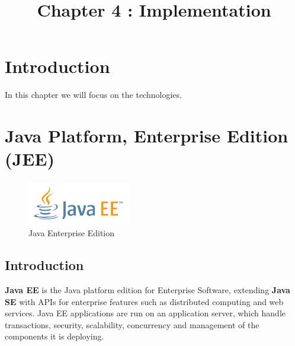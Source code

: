 \documentclass[12pt]{article}
\begin{document}
\listoffigures
	
\title{Chapter 4 : Implementation}
\maketitle
	\section{Introduction}
	
	In this chapter we will focus on the technologies. 
	\clearpage
	\newpage
	\section{Java Platform, Enterprise Edition (JEE)}
		\begin{figure}[h]
		\centering
		\includegraphics[width=0.4\textwidth]{JAVAEE_logo.png}
		\caption{Java Enterprise Edition}
		
	    \end{figure}

\subsection{Introduction}
\textbf{Java EE} is the Java platform edition for Enterprise Software, extending \textbf{Java SE} with APIs for enterprise features such as distributed computing and web services. Java EE applications are run on an application server, which handle transactions, security, scalability, concurrency and management of the components it is deploying.
\\
\\
\end{document}
